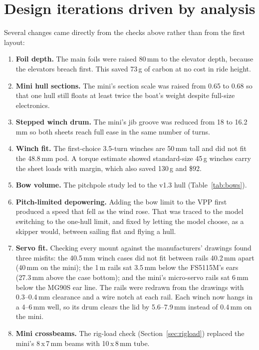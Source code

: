 \documentclass[10pt,twocolumn]{article}
\begin{document}
\section{Design iterations driven by analysis}
Several changes came directly from the checks above rather than from the first layout:
\begin{enumerate}\itemsep1pt
\item \textbf{Foil depth.} The main foils were raised 80\,mm to the elevator depth, because the elevators breach first. This saved 73\,g of carbon at no cost in ride height.
\item \textbf{Mini hull sections.} The mini's section scale was raised from 0.65 to 0.68 so that one hull still floats at least twice the boat's weight despite full-size electronics.
\item \textbf{Stepped winch drum.} The mini's jib groove was reduced from 18 to 16.2\,mm so both sheets reach full ease in the same number of turns.
\item \textbf{Winch fit.} The first-choice 3.5-turn winches are 50\,mm tall and did not fit the 48.8\,mm pod. A torque estimate showed standard-size 45\,g winches carry the sheet loads with margin, which also saved 130\,g and \$92.
\item \textbf{Bow volume.} The pitchpole study led to the v1.3 hull (Table~\ref{tab:bows}).
\item \textbf{Pitch-limited depowering.} Adding the bow limit to the VPP first produced a speed that fell as the wind rose. That was traced to the model switching to the one-hull limit, and fixed by letting the model choose, as a skipper would, between sailing flat and flying a hull.
\item \textbf{Servo fit.} Checking every mount against the manufacturers' drawings found three misfits: the 40.5\,mm winch cases did not fit between rails 40.2\,mm apart (40\,mm on the mini); the 1\,m rails sat 3.5\,mm below the FS5115M's ears (27.3\,mm above the case bottom); and the mini's micro-servo rails sat 6\,mm below the MG90S ear line. The rails were redrawn from the drawings with 0.3--0.4\,mm clearance and a wire notch at each rail. Each winch now hangs in a 4--6\,mm well, so its drum clears the lid by 5.6--7.9\,mm instead of 0.4\,mm on the mini.
\item \textbf{Mini crossbeams.} The rig-load check (Section~\ref{sec:rigload}) replaced the mini's 8\,x\,7\,mm beams with 10\,x\,8\,mm tube.

\end{enumerate}
\end{document}
